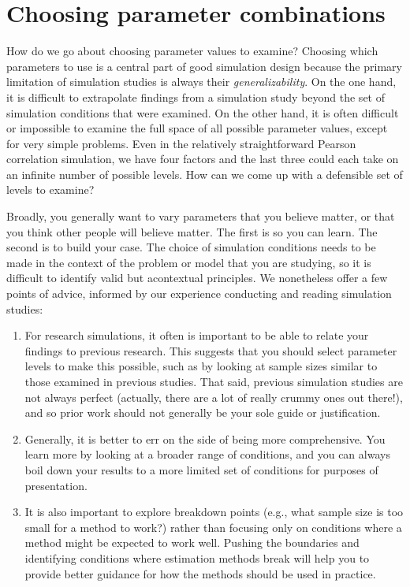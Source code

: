 \documentclass[
]{book}
\begin{document}
\section{Choosing parameter combinations}\label{choosing-parameter-combinations}

How do we go about choosing parameter values to examine?
Choosing which parameters to use is a central part of good simulation design because the primary limitation of simulation studies is always their \emph{generalizability}.
On the one hand, it is difficult to extrapolate findings from a simulation study beyond the set of simulation conditions that were examined. On the other hand, it is often difficult or impossible to examine the full space of all possible parameter values, except for very simple problems.
Even in the relatively straightforward Pearson correlation simulation, we have four factors and the last three could each take on an infinite number of possible levels.
How can we come up with a defensible set of levels to examine?

Broadly, you generally want to vary parameters that you believe matter, or that you think other people will believe matter.
The first is so you can learn.
The second is to build your case.
The choice of simulation conditions needs to be made in the context of the problem or model that you are studying, so it is difficult to identify valid but acontextual principles.
We nonetheless offer a few points of advice, informed by our experience conducting and reading simulation studies:

\begin{enumerate}
\def\labelenumi{\arabic{enumi}.}
\item
  For research simulations, it often is important to be able to relate your findings to previous research. This suggests that you should select parameter levels to make this possible, such as by looking at sample sizes similar to those examined in previous studies. That said, previous simulation studies are not always perfect (actually, there are a lot of really crummy ones out there!), and so prior work should not generally be your sole guide or justification.
\item
  Generally, it is better to err on the side of being more comprehensive. You learn more by looking at a broader range of conditions, and you can always boil down your results to a more limited set of conditions for purposes of presentation.
\item
  It is also important to explore breakdown points (e.g., what sample size is too small for a method to work?) rather than focusing only on conditions where a method might be expected to work well. Pushing the boundaries and identifying conditions where estimation methods break will help you to provide better guidance for how the methods should be used in practice.
\end{enumerate}
\end{document}
